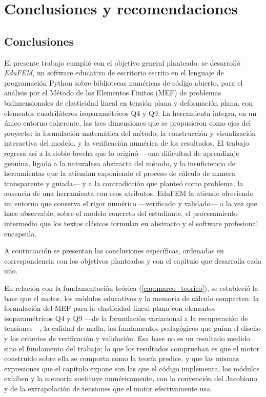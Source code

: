 \chapter*{Conclusiones y recomendaciones}

\section*{Conclusiones}

El presente trabajo cumplió con el objetivo general planteado: se desarrolló \emph{EduFEM}, un software educativo de escritorio escrito en el lenguaje de programación Python sobre bibliotecas numéricas de código abierto, para el análisis por el Método de los Elementos Finitos (MEF) de problemas bidimensionales de elasticidad lineal en tensión plana y deformación plana, con elementos cuadriláteros isoparamétricos Q4 y Q9. La herramienta integra, en un único entorno coherente, las tres dimensiones que se propusieron como ejes del proyecto: la formulación matemática del método, la construcción y visualización interactiva del modelo, y la verificación numérica de los resultados. El trabajo regresa así a la doble brecha que lo originó —una dificultad de aprendizaje genuina, ligada a la naturaleza abstracta del método, y la insuficiencia de herramientas que la atiendan exponiendo el proceso de cálculo de manera transparente y guiada— y a la contradicción que planteó como problema, la ausencia de una herramienta con esos atributos. EduFEM la atiende ofreciendo un entorno que conserva el rigor numérico —verificado y validado— a la vez que hace observable, sobre el modelo concreto del estudiante, el procesamiento intermedio que los textos clásicos formulan en abstracto y el software profesional encapsula.

A continuación se presentan las conclusiones específicas, ordenadas en correspondencia con los objetivos planteados y con el capítulo que desarrolla cada uno.

En relación con la fundamentación teórica (\autoref{cap:marco_teorico}), se estableció la base que el motor, los módulos educativos y la memoria de cálculo comparten: la formulación del MEF para la elasticidad lineal plana con elementos isoparamétricos Q4 y Q9 —de la formulación variacional a la recuperación de tensiones—, la calidad de malla, los fundamentos pedagógicos que guían el diseño y los criterios de verificación y validación. Esa base no es un resultado medido sino el fundamento del trabajo; lo que los resultados comprueban es que el motor construido sobre ella se comporta como la teoría predice, y que las mismas expresiones que el capítulo expone son las que el código implementa, los módulos exhiben y la memoria sustituye numéricamente, con la convención del Jacobiano y de la extrapolación de tensiones que el motor efectivamente usa.

